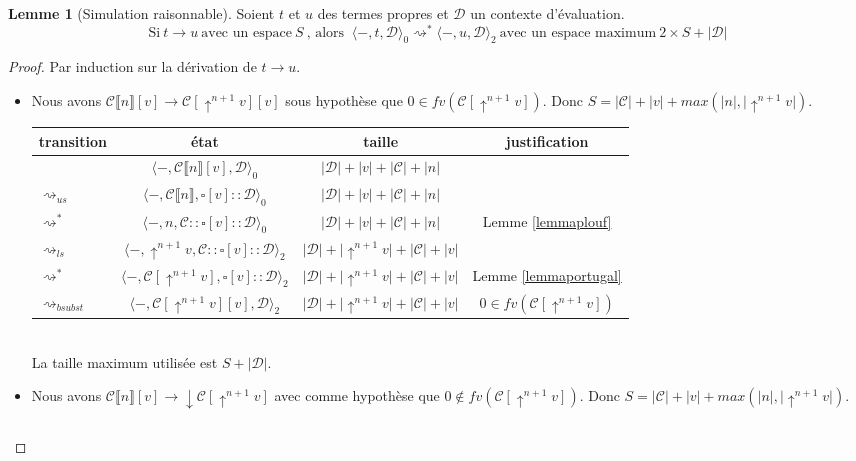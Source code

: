 \documentclass[11pt,a4paper]{article}
\theoremstyle{definition}
\newtheorem{lemma}[theorem]{Lemme}
\newcommand{\etat}[1]{\langle #1 \rangle}
\newcommand{\etatz}[1]{\langle #1 \rangle_0}
\newcommand{\etatd}[1]{\langle #1 \rangle_2}
\newcommand{\mcd}{\mathcal{D}}
\newcommand{\mcc}{\mathcal{C}}
\newcommand{\mtc}{\mathcal{C}}
\newcommand{\da}{\downarrow}
\newcommand{\ua}{\uparrow}
\begin{document}
\begin{lemma}[Simulation raisonnable]
  \label{lem:sim}
  Soient $t$ et $u$ des termes propres et $\mcd$ un contexte d'évaluation.
  \[
    \text{Si}~t \rightarrow u~\text{avec un espace}~S~\text{, alors }~\etat{-,t,\mcd}_0 \rightsquigarrow^* \etat{-,u,\mcd}_2~\text{avec un espace maximum}~2 \times S+|\mcd|
  \]
\end{lemma}
\begin{proof}
  Par induction sur la dérivation de $t\rightarrow u$.
  \begin{itemize}
    \item {} Nous avons $\mtc\llbracket n\rrbracket[v]\rightarrow \mcc[\ua^{n+1} v][v]$ sous hypothèse que $0\in fv(\mcc[\ua^{n+1} v])$. Donc $S = |\mcc|+|v| + max(|n|, |\ua^{n+1} v|)$.\\
      \begin{tabular}{@{}l c c c@{}}
        \toprule
        transition & état & taille & justification\\
        \midrule
                   & $\etatz{-,\mcc\llbracket n\rrbracket[v],\mcd}$ & $|\mcd|+|v|+|\mcc|+|n|$\\
        $\rightsquigarrow_{us}$ & $ \etatz{-, \mcc\llbracket n \rrbracket, \square[v]::\mcd}$ & $|\mcd| + |v| + |\mcc|+|n|$\\ 
        $\rightsquigarrow^*$ & $ \etatz{-, n ,\mcc:: \square[v]::\mcd}$ & $|\mcd| + |v| + |\mcc|+|n|$& Lemme \ref{lemmaplouf}\\
        $\rightsquigarrow_{ls}$ & $ \etatd{-, \ua^{n+1} v ,\mcc:: \square[v]::\mcd}$ & $|\mcd| + |\ua^{n+1} v| + |\mcc|+|v|$\\
        $\rightsquigarrow^*$ & $ \etatd{-, \mcc[\ua^{n+1} v], \square[v]::\mcd}$ & $|\mcd| + |\ua^{n+1} v| + |\mcc|+|v|$ &Lemme \ref{lemmaportugal}\\ 
        $\rightsquigarrow_{bsubst}$ & $ \etatd{-, \mcc[\ua^{n+1} v][v], \mcd}$ & $|\mcd| + |\ua^{n+1}v| + |\mcc|+|v|$&$0\in fv(\mcc[\ua^{n+1} v])$\\ 
        \bottomrule
      \end{tabular}\\
      La taille maximum utilisée est $S +|\mcd|$.
    \item {} Nous avons $\mtc\llbracket n\rrbracket[v]\rightarrow \da\mcc[\ua^{n+1} v]$ avec comme hypothèse que $0\notin fv(\mcc[\ua^{n+1} v])$. Donc $S = |\mcc|+|v| + max(|n|, |\ua^{n+1} v|)$.\\
      \begin{tabular}{@{}l c c c@{}}

\end{tabular}
\end{itemize}
\end{proof}
\end{document}
